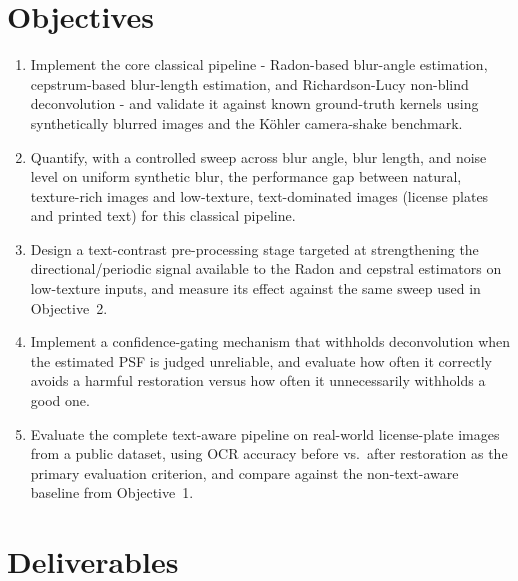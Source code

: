 \documentclass[11pt,a4paper]{article}
\begin{document}
\section{Objectives}

\begin{enumerate}
    \item Implement the core classical pipeline - Radon-based blur-angle estimation,
    cepstrum-based blur-length estimation, and Richardson-Lucy non-blind
    deconvolution - and validate it against known ground-truth kernels using
    synthetically blurred images and the Köhler camera-shake benchmark.
    \item Quantify, with a controlled sweep across blur angle, blur length, and noise level
    on uniform synthetic blur, the performance gap between natural, texture-rich images
    and low-texture, text-dominated images (license plates and printed text) for this
    classical pipeline.
    \item Design a text-contrast pre-processing stage targeted at strengthening the
    directional/periodic signal available to the Radon and cepstral estimators on
    low-texture inputs, and measure its effect against the same sweep used in
    Objective~2.
    \item Implement a confidence-gating mechanism that withholds deconvolution when
    the estimated PSF is judged unreliable, and evaluate how often it correctly avoids
    a harmful restoration versus how often it unnecessarily withholds a good one.
    \item Evaluate the complete text-aware pipeline on real-world license-plate images
    from a public dataset, using OCR accuracy before vs.\ after restoration as the
    primary evaluation criterion, and compare against the non-text-aware baseline
    from Objective~1.
\end{enumerate}

\section{Deliverables}
\end{document}
